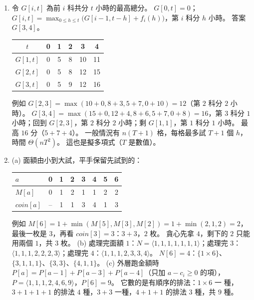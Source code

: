 \begin{enumerate}
\item 令 $G[i, t]$ 為前 $i$ 科共分 $t$ 小時的最高總分。 $G[0, t] = 0$；
$G[i, t] = \max_{0 \le h \le t} \bigl(G[i-1, t-h] + f_i(h)\bigr)$，第 $i$ 科分 $h$ 小時。 答案
$G[3, 4]$。
\begin{center}
\begin{tabular}{c*{5}{c}}
\toprule
$t$ & 0 & 1 & 2 & 3 & 4 \\
\midrule
$G[1, t]$ & 0 & 5 & 8 & 10 & 11 \\
$G[2, t]$ & 0 & 5 & 8 & 12 & 15 \\
$G[3, t]$ & 0 & 5 & 9 & 12 & 16 \\
\bottomrule
\end{tabular}
\end{center}
例如 $G[2, 3] = \max(10 + 0, 8 + 3, 5 + 7, 0 + 10) = 12$（第 $2$ 科分 $2$ 小時）。 $G[3, 4] =
\max(15 + 0, 12 + 4, 8 + 6, 5 + 7, 0 + 8) = 16$，第 $3$ 科分 $1$ 小時；回到 $G[2, 3]$，第 $2$
科分 $2$ 小時；剩 $G[1, 1]$，第 $1$ 科分 $1$ 小時。 最高 $16$ 分（$5 + 7 + 4$）。 一般情況有
$n(T+1)$ 格，每格最多試 $T + 1$ 個 $h$，時間 $\Theta(nT^2)$。 這也是擬多項式（$T$ 是數值）。

\item (a) 面額由小到大試，平手保留先試到的：
\begin{center}
\begin{tabular}{l*{7}{c}}
\toprule
$a$ & 0 & 1 & 2 & 3 & 4 & 5 & 6 \\
\midrule
$M[a]$ & 0 & 1 & 2 & 1 & 1 & 2 & 2 \\
$\mathit{coin}[a]$ & -- & 1 & 1 & 3 & 4 & 1 & 3 \\
\bottomrule
\end{tabular}
\end{center}
例如 $M[6] = 1 + \min(M[5], M[3], M[2]) = 1 + \min(2, 1, 2) = 2$，最後一枚是 $3$，再看
$\mathit{coin}[3] = 3$：$3 + 3$，$2$ 枚。 貪心先拿 $4$，剩下的 $2$ 只能用兩個 $1$，共 $3$ 枚。
(b) 處理完面額 $1$：$N = \langle 1, 1, 1, 1, 1, 1, 1 \rangle$；處理完 $3$：$\langle 1, 1, 1, 2,
2, 2, 3 \rangle$；處理完 $4$：$\langle 1, 1, 1, 2, 3, 3, 4 \rangle$。 $N[6] = 4$：$\{1 \times
6\}$、$\{3, 1, 1, 1\}$、$\{3, 3\}$、$\{4, 1, 1\}$。
(c) 外層跑金額時 $P[a] = P[a - 1] + P[a - 3] + P[a - 4]$（只加 $a - c_i \ge 0$ 的項），
$P = \langle 1, 1, 1, 2, 4, 6, 9 \rangle$，$P[6] = 9$。 它數的是有順序的排法：$1 \times 6$ 一
種，$3 + 1 + 1 + 1$ 的排法 $4$ 種，$3 + 3$ 一種，$4 + 1 + 1$ 的排法 $3$ 種，共 $9$ 種。


\end{enumerate}
